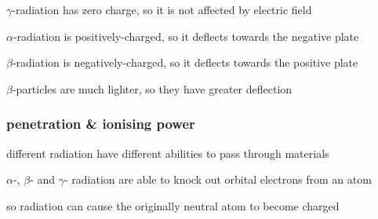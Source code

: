 



\begin{figure}[ht]
	\centering
\end{figure}

\sol $\gamma$-radiation has zero charge, so it is not affected by electric field

$\alpha$-radiation is positively-charged, so it deflects towards the negative plate

$\beta$-radiation is negatively-charged, so it deflects towards the positive plate

$\beta$-particles are much lighter, so they have greater deflection \eoe


\subsubsection*{penetration \& ionising power}

different radiation have different abilities to pass through materials

$\alpha$-, $\beta$- and $\gamma$- radiation are able to knock out orbital electrons from an atom

so radiation can cause the originally neutral atom to become charged

